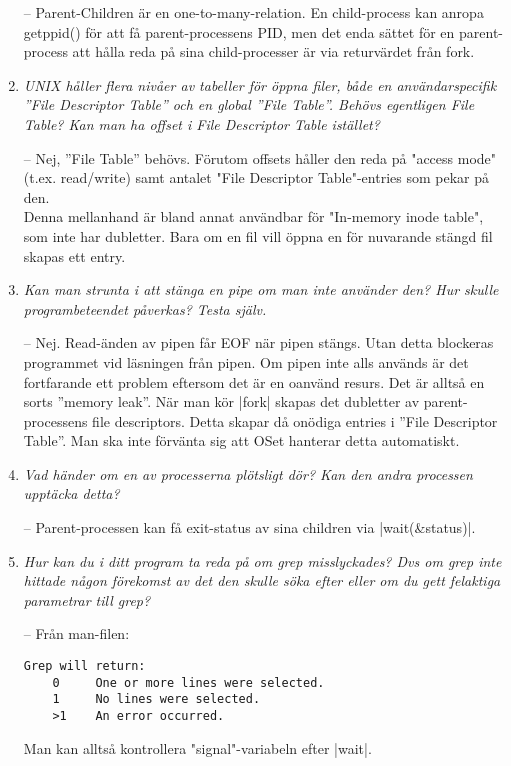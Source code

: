\documentclass[paper=a4, fontsize=11pt]{scrartcl} %
\numberwithin{equation}{section} %
\numberwithin{figure}{section} %
\numberwithin{table}{section} %
\begin{document}
\begin{enumerate}[1)]
-- Parent-Children är en one-to-many-relation. En child-process kan anropa getppid() för att få parent-processens PID,
men det enda sättet för en parent-process att hålla reda på sina child-processer är via returvärdet från fork.

\item \emph{UNIX håller flera nivåer av tabeller för öppna filer, både en användarspecifik ''File Descriptor Table'' och en global ''File Table''. Behövs egentligen File Table? Kan man ha offset i File Descriptor Table istället?}

-- Nej, ''File Table'' behövs. Förutom offsets håller den reda på "access mode" (t.ex. read/write) samt antalet "File Descriptor Table"-entries som pekar på den.\\
Denna mellanhand är bland annat användbar för "In-memory inode table", som inte har dubletter. Bara om en fil vill öppna en för nuvarande stängd fil skapas ett entry.

\item \emph{Kan man strunta i att stänga en pipe om man inte använder den? Hur skulle programbeteendet påverkas? Testa själv.}

-- Nej. Read-änden av pipen får EOF när pipen stängs. Utan detta blockeras programmet vid läsningen från pipen.
Om pipen inte alls används är det fortfarande ett problem eftersom det är en oanvänd resurs. Det är alltså en sorts ''memory leak''. När man kör |fork| skapas det dubletter av parent-processens file descriptors. Detta skapar då onödiga entries i ''File Descriptor Table''. Man ska inte förvänta sig att OSet hanterar detta automatiskt.

\item \emph{Vad händer om en av processerna plötsligt dör? Kan den andra processen upptäcka detta?}

-- Parent-processen kan få exit-status av sina children via |wait(&status)|.

\item \emph{Hur kan du i ditt program ta reda på om grep misslyckades? Dvs om grep inte hittade någon förekomst av det den skulle söka efter eller om du gett felaktiga parametrar till grep?}

-- Från man-filen:
\begin{verbatim}
Grep will return:
    0     One or more lines were selected.
    1     No lines were selected.
    >1    An error occurred.
\end{verbatim}

Man kan alltså kontrollera "signal"-variabeln efter |wait|.

\end{enumerate}
\end{document}
